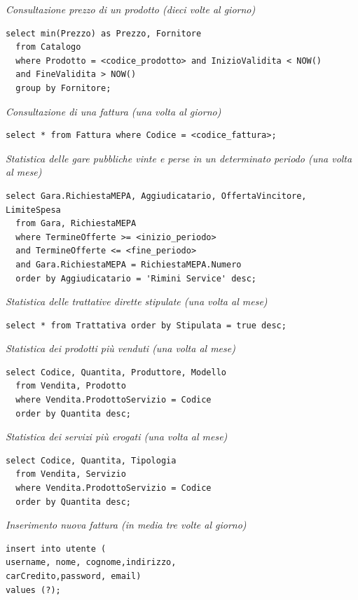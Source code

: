 \noindent\textit{Consultazione prezzo di un prodotto (dieci volte al giorno)}
\begin{verbatim}
select min(Prezzo) as Prezzo, Fornitore
  from Catalogo
  where Prodotto = <codice_prodotto> and InizioValidita < NOW()
  and FineValidita > NOW()
  group by Fornitore;
\end{verbatim}
\vspace{1cm}

\noindent\textit{Consultazione di una fattura (una volta al giorno)}
\begin{verbatim}
select * from Fattura where Codice = <codice_fattura>;
\end{verbatim}
\vspace{1cm}

\noindent\textit{Statistica delle gare pubbliche vinte e perse in un determinato periodo (una volta al mese)}
\begin{verbatim}
select Gara.RichiestaMEPA, Aggiudicatario, OffertaVincitore, LimiteSpesa
  from Gara, RichiestaMEPA
  where TermineOfferte >= <inizio_periodo>
  and TermineOfferte <= <fine_periodo>
  and Gara.RichiestaMEPA = RichiestaMEPA.Numero
  order by Aggiudicatario = 'Rimini Service' desc;

\end{verbatim}
\vspace{1cm}

\noindent\textit{Statistica delle trattative dirette stipulate (una volta al mese)}
\begin{verbatim}
select * from Trattativa order by Stipulata = true desc;
\end{verbatim}
\vspace{1cm}

\noindent\textit{Statistica dei prodotti più venduti (una volta al mese)}
\begin{verbatim}
select Codice, Quantita, Produttore, Modello
  from Vendita, Prodotto
  where Vendita.ProdottoServizio = Codice
  order by Quantita desc;
\end{verbatim}
\vspace{1cm}

\noindent\textit{Statistica dei servizi più erogati (una volta al mese)}
\begin{verbatim}
select Codice, Quantita, Tipologia
  from Vendita, Servizio
  where Vendita.ProdottoServizio = Codice
  order by Quantita desc;
\end{verbatim}
\vspace{1cm}

\noindent\textit{Inserimento nuova fattura (in media tre volte al giorno)}
\begin{verbatim}
insert into utente (
username, nome, cognome,indirizzo,
carCredito,password, email)
values (?);
\end{verbatim}
\vspace{0.5cm}

